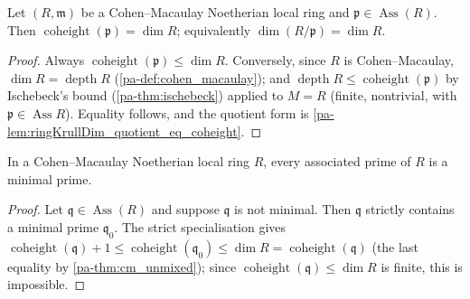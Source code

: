 \begin{theorem}
  \label{pa-thm:cm_unmixed}
  \leanok

  Let \((R, \mathfrak m)\) be a Cohen--Macaulay Noetherian local ring and
  \(\mathfrak p \in \operatorname{Ass}(R)\). Then
  \(\operatorname{coheight}(\mathfrak p) = \dim R\); equivalently
  \(\dim(R/\mathfrak p) = \dim R\).
\end{theorem}
\begin{proof}
  \leanok
  Always \(\operatorname{coheight}(\mathfrak p) \le \dim R\). Conversely, since
  \(R\) is Cohen--Macaulay, \(\dim R = \operatorname{depth} R\)
  (\ref{pa-def:cohen_macaulay}); and \(\operatorname{depth} R \le
  \operatorname{coheight}(\mathfrak p)\) by Ischebeck's bound (\ref{pa-thm:ischebeck})
  applied to \(M = R\) (finite, nontrivial, with \(\mathfrak p \in
  \operatorname{Ass} R\)). Equality follows, and the quotient form is
  \ref{pa-lem:ringKrullDim_quotient_eq_coheight}.
\end{proof}

\begin{theorem}
  \label{pa-thm:cm_ass_minimal}
  \leanok

  In a Cohen--Macaulay Noetherian local ring \(R\), every associated prime of
  \(R\) is a minimal prime.
\end{theorem}
\begin{proof}
  \leanok
  Let \(\mathfrak q \in \operatorname{Ass}(R)\) and suppose \(\mathfrak q\) is not
  minimal. Then \(\mathfrak q\) strictly contains a minimal prime
  \(\mathfrak q_0\). The strict specialisation gives
  \(\operatorname{coheight}(\mathfrak q) + 1 \le \operatorname{coheight}(\mathfrak q_0)
  \le \dim R = \operatorname{coheight}(\mathfrak q)\) (the last equality by
  \ref{pa-thm:cm_unmixed}); since \(\operatorname{coheight}(\mathfrak q) \le \dim R\)
  is finite, this is impossible.
\end{proof}

